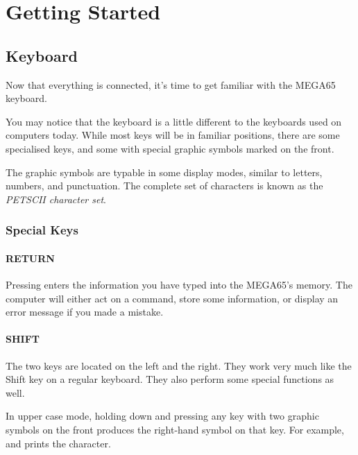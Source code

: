\chapter{Getting Started}
\hypersetup{bookmarksdepth=5}

\section{Keyboard}
\label{cha:getting-started}

Now that everything is connected, it's time to get familiar with the MEGA65 keyboard.

You may notice that the keyboard is a little different to the keyboards used on computers today. While most keys will be in familiar positions, there are some specialised keys, and some with special graphic symbols marked on the front.

The graphic symbols are typable in some display modes, similar to letters, numbers, and punctuation. The complete set of characters is known as the {\em PETSCII character set}.

\subsection{Special Keys}

\subsubsection{RETURN}
Pressing  enters the information you have typed into the MEGA65's memory. The computer will either act on a command, store some information, or display an error message if you made a mistake.

\subsubsection{SHIFT}
The two  keys are located on the left and the right. They work very much like the Shift key on a regular keyboard. They also perform some special functions as well.

In upper case mode, holding down  and pressing any key with two graphic symbols on the front produces the right-hand symbol on that key. For example,  and  prints the  character.

